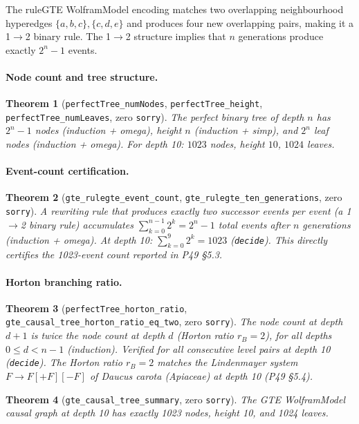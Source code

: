 \documentclass[11pt,a4paper]{article}
\newtheorem{theorem}{Theorem}[section]
\theoremstyle{definition}
\begin{document}
The ruleGTE WolframModel encoding matches two overlapping neighbourhood hyperedges
$\{a,b,c\},\{c,d,e\}$ and produces four new overlapping pairs, making it a 1$\to$2
binary rule.  The 1$\to$2 structure implies that $n$ generations produce exactly
$2^n - 1$ events.

\paragraph{Node count and tree structure.}
\begin{theorem}[\lstinline|perfectTree_numNodes|, \lstinline|perfectTree_height|, \lstinline|perfectTree_numLeaves|, zero \texttt{sorry}]
The perfect binary tree of depth $n$ has $2^n-1$ nodes (induction + omega),
height $n$ (induction + simp), and $2^n$ leaf nodes (induction + omega).
For depth 10: $1023$ nodes, height $10$, $1024$ leaves.
\end{theorem}

\paragraph{Event-count certification.}
\begin{theorem}[\lstinline|gte_rulegte_event_count|, \lstinline|gte_rulegte_ten_generations|, zero \texttt{sorry}]
A rewriting rule that produces exactly two successor events per event (a 1$\to$2
binary rule) accumulates $\sum_{k=0}^{n-1} 2^k = 2^n - 1$ total events after
$n$ generations (induction + omega).
At depth 10: $\sum_{k=0}^{9} 2^k = 1023$ (\lstinline|decide|).
This directly certifies the 1023-event count reported in P49 \S5.3.
\end{theorem}

\paragraph{Horton branching ratio.}
\begin{theorem}[\lstinline|perfectTree_horton_ratio|, \lstinline|gte_causal_tree_horton_ratio_eq_two|, zero \texttt{sorry}]
The node count at depth $d+1$ is twice the node count at depth $d$ (Horton ratio
$r_B = 2$), for all depths $0 \le d < n-1$ (induction).
Verified for all consecutive level pairs at depth 10 (\lstinline|decide|).
The Horton ratio $r_B = 2$ matches the Lindenmayer system $F \to F[+F][-F]$ of
\emph{Daucus carota} (Apiaceae) at depth 10 (P49 \S5.4).
\end{theorem}

\begin{theorem}[\lstinline|gte_causal_tree_summary|, zero \texttt{sorry}]
The GTE WolframModel causal graph at depth 10 has exactly 1023 nodes,
height 10, and 1024 leaves.
\end{theorem}
\end{document}
